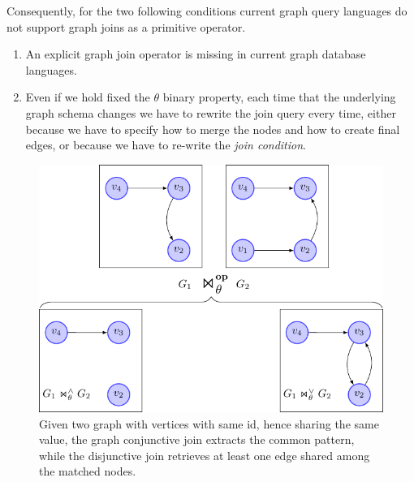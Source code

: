 \begin{description}
	Consequently, for the two following conditions current graph query languages do not support
	graph joins as a primitive operator.
	\begin{enumerate}
		\item An explicit graph join operator is missing in current graph database languages.
		\item Even if we hold fixed the $\theta$ binary property, each time that the underlying graph schema
		changes we have to rewrite the join query every time, either because we have to specify how to merge
		the nodes and how to create final edges, or because we have to re-write the \textit{join condition}.
	\end{enumerate}
\end{description}

\begin{figure}[!t]
	\centering
	\includegraphics[scale=0.7]{fig/03joins/g1g2_general_conjdisj.pdf}
	\caption{Given two graph with vertices with same id, hence sharing the same value, the graph conjunctive
		join extracts the common pattern, while the disjunctive join retrieves at least one edge shared
		among the matched nodes.}
	\label{fig:conjdisjbasicex}
\end{figure}
